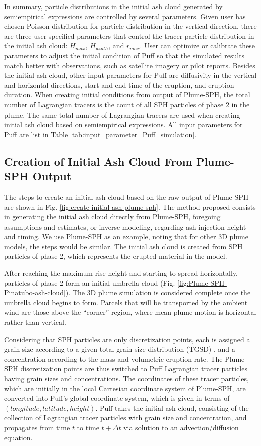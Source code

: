 \documentclass[utf8]{frontiersSCNS} %
\begin{document}
In summary, particle distributions in the initial ash cloud generated by semiempirical expressions are controlled by several parameters. Given user has chosen Poisson distribution for particle distribution in the vertical direction, there are three user specified parameters that control the tracer particle distribution in the initial ash cloud: $H_{max}$, $H_{width}$, and $r_{max}$. User can optimize or calibrate these parameters to adjust the initial condition of Puff so that the simulated results match better with observations, such as satellite imagery or pilot reports. Besides the initial ash cloud,  other input parameters for Puff are diffusivity in the vertical and horizontal directions, start and end time of the eruption, and eruption duration. When creating initial conditions from output of Plume-SPH, the total number of Lagrangian tracers is the count of all SPH particles of phase 2 in the plume. The same total number of Lagrangian tracers are used when creating initial ash cloud based on semiempirical expressions. All input parameters for Puff are list in Table \ref{tab:input_parameter_Puff_simulation}.

\subsection{Creation of Initial Ash Cloud From Plume-SPH Output} \label{sec:create-initial-condition}
The steps to create an initial ash cloud based on the raw output of Plume-SPH are shown in Fig. \ref{fig:create-initial-ash-plume-sph}.
The method proposed consists in generating the initial ash cloud directly from Plume-SPH, foregoing assumptions and estimates, or inverse modeling, regarding ash injection height and timing.
We use Plume-SPH as an example, noting that for other 3D plume models, the steps would be similar. The initial ash cloud is created from SPH particles of phase 2, which represents the erupted material in the model.

After reaching the maximum rise height and starting to spread horizontally, particles of phase 2 form an initial umbrella cloud (Fig. \ref{fig:Plume-SPH-Pinatubo-ash-cloud}). The 3D plume simulation is considered complete once the umbrella cloud begins to form. Parcels that will be transported by the ambient wind are those above the ``corner'' region, where mean plume motion is horizontal rather than vertical.

Considering that SPH particles are only discretization points, each is assigned a grain size according to a given total grain size distribution (TGSD) \citep{paladio1996tephra}, and a concentration according to the mass and volumetric eruption rate. The Plume-SPH discretization points are thus switched to Puff Lagrangian tracer particles having grain sizes and concentrations. The coordinates of these tracer particles, which are initially in the local Cartesian coordinate system of Plume-SPH, are converted into Puff's global coordinate system, which is given in terms of $(longitude, latitude, height)$. Puff takes the initial ash cloud, consisting of the collection of Lagrangian tracer particles with grain size and concentration, and propagates from time $t$ to time $t+\Delta t$ via solution to an advection/diffusion equation.
\end{document}
